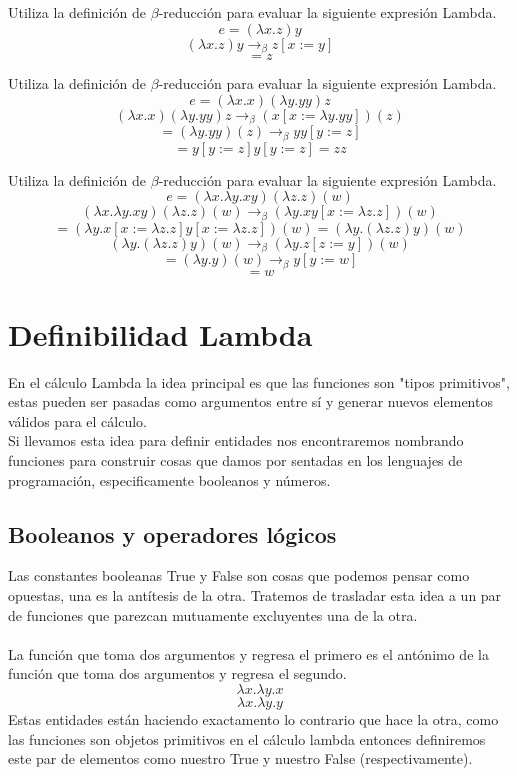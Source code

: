     \begin{exercise}
    Utiliza la definición de $\beta$-reducción para evaluar la siguiente expresión Lambda.
    $$e= (\lambda x.z)y$$
    \[ (\lambda x.z)y \rightarrow_\beta  z [x := y]\]
    \[ = z \]
    \end{exercise}

    \begin{exercise}
        Utiliza la definición de $\beta$-reducción para evaluar la siguiente expresión Lambda.
        $$e = (\lambda x.x)(\lambda y.yy) z$$
        \[ (\lambda x.x)(\lambda y.yy) z \rightarrow_\beta (x[x:=\lambda y.yy])(z)\]
        \[ = (\lambda y.yy)(z) \rightarrow_\beta yy[y:=z]\]
        \[ =  y[y:=z]y[y:=z] = zz\]
    \end{exercise}


    \begin{exercise}
        Utiliza la definición de $\beta$-reducción para evaluar la siguiente expresión Lambda.
        $$e= (\lambda x.\lambda y.xy)(\lambda z.z)(w)$$
        \[(\lambda x.\lambda y.xy)(\lambda z.z)(w) \rightarrow_\beta (\lambda y.xy[x := \lambda z.z])(w) \]
        \[ =  (\lambda y.x[x := \lambda z.z]y[x := \lambda z.z])(w) = (\lambda y.(\lambda z.z)y)(w) \]
        \[ (\lambda y.(\lambda z.z)y)(w) \rightarrow_\beta (\lambda y.z[z := y])(w) \]
        \[ = (\lambda y.y)(w) \rightarrow_\beta y[y := w] \]
        \[ = w \]
    \end{exercise}

    \section{Definibilidad Lambda}
    En el cálculo Lambda la idea principal es que las funciones son "tipos primitivos", estas pueden ser pasadas como argumentos entre sí y generar nuevos elementos válidos para el cálculo.\\
    Si llevamos esta idea para definir entidades nos encontraremos nombrando funciones para construir cosas que damos por sentadas en los lenguajes de programación, especificamente booleanos y números.

    \subsection{Booleanos y operadores lógicos}
    Las constantes booleanas True y False son cosas que podemos pensar como opuestas, una es la antítesis de la otra. Tratemos de trasladar esta idea a un par de funciones que parezcan mutuamente excluyentes una de la otra.\\\\
    La función que toma dos argumentos y regresa el primero es el antónimo de la función que toma dos argumentos y regresa el segundo.
    \[
        \lambda x.\lambda y.x
    \]
    \[
        \lambda x.\lambda y.y
    \]
    Estas entidades están haciendo exactamento lo contrario que hace la otra, como las funciones son objetos primitivos en el cálculo lambda entonces definiremos este par de elementos como nuestro True y nuestro False (respectivamente).

